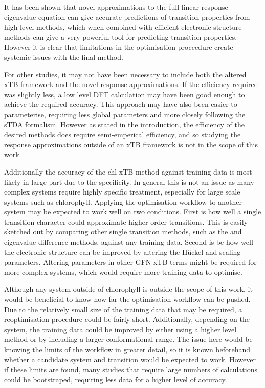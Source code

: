 It has been shown that novel approximations to the full linear-response eigenvalue
equation can give accurate predictions of transition properties from high-level 
methods, which when combined with efficient electronic structure methods can give
a very powerful tool for predicting transition properties. However it is clear that
limitations in the optimisation proceedure create systemic issues with the final
method.

For other studies, it may not have been necessary to include both the altered xTB
framework and the novel response approximations. If the efficiency required was 
slightly less, a low level DFT calculation may have been good enough to achieve 
the required accuracy. This approach may have also been easier to parameterise, 
requiring less global parameters and more closely following the sTDA formalism.
However as stated in the introduction, the efficiency of the desired methods does
require semi-emperical efficiency, and so studying the response approximations outside
of an xTB framework is not in the scope of this work.

Additionally the accuracy of the chl-xTB method against training data is most likely
in large part due to the specificity. In general this is not an issue as many complex
systems require highly specific treatment, especially for large scale systems such
as chlorophyll. Applying the optimisation workflow to another system may be expected
to work well on two conditions. First is how well a single transition character
could approximate higher order transitions. This is easily sketched out by comparing
other single transition methods, such as the \dscf and eigenvalue difference methods,
against any training data. Second is be how well the electronic structure can be 
improved by altering the H{\"u}ckel and scaling parameters. Altering parameters
in other GFN-xTB terms might be required for more complex systems, which would require
more training data to optimise.

Although any system outside of chlorophyll is outside the scope of this work, it
would be beneficial to know how far the optimisation workflow can be pushed. Due
to the relatively small size of the training data that may be required, a reoptimisation
procedure could be fairly short. Additionally, depending on the system, the training
data could be improved by either using a higher level method or by including a larger
conformational range. The issue here would be knowing the limits of the workflow
in greater detail, so it is known beforehand whether a candidate system and transition
would be expected to work. However if these limits are found, many studies that 
require large numbers of calculations could be bootstraped, requiring less data 
for a higher level of accuracy.

